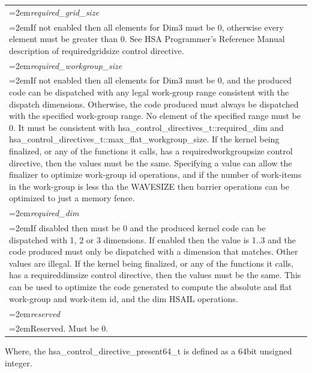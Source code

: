 \documentclass{book}
\newcommand{\hsaarg}[1]{\textit{#1}}
\newcommand{\hsatyp}[2]{\hypertarget{#1}{#2}}
\newcommand{\reftyp}[1]{#1}
\begin{document}
\begin{appendices}
\begin{longtable}{@{}>{\hangindent=2em}p{\textwidth}}
\hsaarg{required\_grid\_size}\\\hspace{2em}If not enabled then all elements for Dim3 must be 0, otherwise every element must be greater than 0. See HSA Programmer's Reference Manual description of requiredgridsize control directive.\\[2mm]
\hsaarg{required\_workgroup\_size}\\\hspace{2em}If not enabled then all elements for Dim3 must be 0, and the produced code can be dispatched with any legal work-group range consistent with the dispatch dimensions. Otherwise, the code produced must always be dispatched with the specified work-group range. No element of the specified range must be 0. It must be consistent with \hsatyp{structhsa__control__directives__s_1adbb0910ab57f89f724dbae7e4686bd07}{hsa\_control\_directives\_t::required\_dim} and \hsatyp{structhsa__control__directives__s_1ae30ad3d68e645c93be02705bae5f2a20}{hsa\_control\_directives\_t::max\_flat\_workgroup\_size}. If the kernel being finalized, or any of the functions it calls, has a requiredworkgroupsize control directive, then the values must be the same. Specifying a value can allow the finalizer to optimize work-group id operations, and if the number of work-items in the work-group is less tha the WAVESIZE then barrier operations can be optimized to just a memory fence.\\[2mm]
\hsaarg{required\_dim}\\\hspace{2em}If disabled then must be 0 and the produced kernel code can be dispatched with 1, 2 or 3 dimensions. If enabled then the value is 1..3 and the code produced must only be dispatched with a dimension that matches. Other values are illegal. If the kernel being finalized, or any of the functions it calls, has a requireddimsize control directive, then the values must be the same. This can be used to optimize the code generated to compute the absolute and flat work-group and work-item id, and the dim HSAIL operations.\\[2mm]
\hsaarg{reserved}\\\hspace{2em}Reserved. Must be 0.
\end{longtable}

 

Where, the \reftyp{hsa\_control\_directive\_present64\_t} is defined
as a 64bit unsigned integer.
\makeatletter{} 


\end{appendices}
\end{document}
